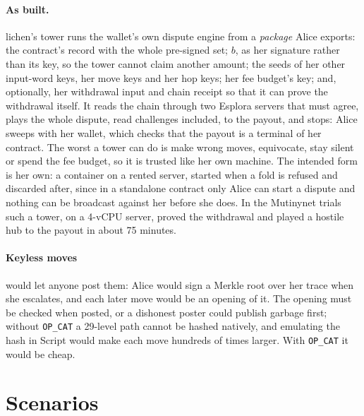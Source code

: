 \documentclass[11pt]{article}
\begin{document}
\paragraph{As built.} lichen's tower runs the wallet's own dispute
engine from a \emph{package} Alice exports: the contract's record with
the whole pre-signed set; $b$, as her signature rather than its key, so
the tower cannot claim another amount; the seeds of her other input-word
keys, her move keys and her hop keys; her fee budget's key; and,
optionally, her withdrawal input and chain receipt so that it can prove
the withdrawal itself. It reads the chain through two Esplora servers
that must agree, plays the whole dispute, read challenges included, to
the payout, and stops: Alice sweeps with her wallet, which checks that
the payout is a terminal of her contract. The worst a tower can do is
make wrong moves, equivocate, stay silent or spend the fee budget, so it
is trusted like her own machine. The intended form is her own: a
container on a rented server, started when a fold is refused and
discarded after, since in a standalone contract only Alice can start a
dispute and nothing can be broadcast against her before she does. In
the Mutinynet trials such a tower, on a 4-vCPU server, proved the
withdrawal and played a hostile hub to the payout in about 75 minutes.

\paragraph{Keyless moves} would let anyone post them: Alice would sign a
Merkle root over her trace when she escalates, and each later move would
be an opening of it. The opening must be checked when posted, or a
dishonest poster could publish garbage first; without \texttt{OP\_CAT}
a 29-level path cannot be hashed natively, and emulating the hash in
Script would make each move hundreds of times larger. With
\texttt{OP\_CAT} it would be cheap.

\section{Scenarios}
\label{sec:scenarios}
\end{document}
